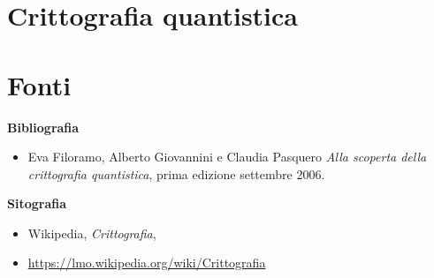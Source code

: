 \documentclass[a4paper, 12pt]{article}
\begin{document}
\section{Crittografia quantistica}

\clearpage

\section{Fonti}

{\large \textbf{Bibliografia}\par}
\begin{itemize}
    \item Eva Filoramo, Alberto Giovannini e Claudia Pasquero \textit{Alla scoperta della crittografia quantistica}, prima edizione settembre 2006.
\end{itemize}

{\large \textbf{Sitografia}\par}
\begin{itemize}
    \item Wikipedia, \textit{Crittografia}, 
    \item[] \href{https://lmo.wikipedia.org/wiki/Crittografia}{https://lmo.wikipedia.org/wiki/Crittografia}
\end{itemize}
\end{document}
